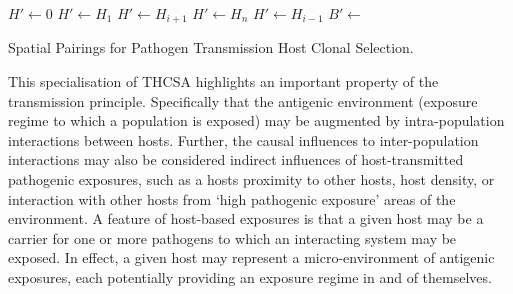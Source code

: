 \begin{algorithm}[ht]
  \SetLine  
  
  \KwIn{\Pop}		  
  
	{
		{
			$H\prime \leftarrow$0\;
			{
				{
					$H\prime \leftarrow H_{1}$\;
				}
				\Else
				{
					$H\prime \leftarrow H_{i+1}$\;
				}				
			}
			\Else
			{
				{
					$H\prime \leftarrow H_{n}$\;
				}
				\Else
				{
					$H\prime \leftarrow H_{i-1}$\;
				}		
			}
			$B\prime \leftarrow$ \;
			\;
		}		
	}
	\caption{Spatial Pairings for Pathogen Transmission Host Clonal Selection.}
	\label{alg:hosts:algorithms:pthcsa:randomspatial}
\end{algorithm}

This specialisation of THCSA highlights an important property of the transmission principle. Specifically that the antigenic environment (exposure regime to which a population is exposed) may be augmented by intra-population interactions between hosts. Further, the causal influences to inter-population interactions may also be considered indirect influences of host-transmitted pathogenic exposures, such as a hosts proximity to other hosts, host density, or interaction with other hosts from `high pathogenic exposure' areas of the environment. A feature of host-based exposures is that a given host may be a carrier for one or more pathogens to which an interacting system may be exposed. In effect, a given host may represent a micro-environment of antigenic exposures, each potentially providing an exposure regime in and of themselves.


%
%
